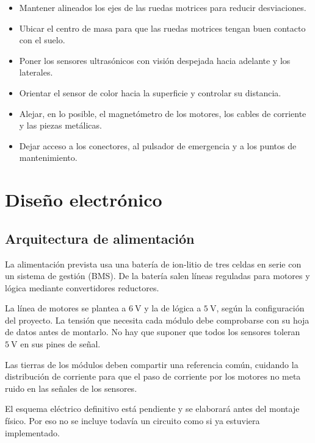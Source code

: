 \documentclass[journal]{IEEEtran}
\begin{document}
\begin{itemize}
    \item Mantener alineados los ejes de las ruedas motrices para reducir desviaciones.
    \item Ubicar el centro de masa para que las ruedas motrices tengan buen contacto con el suelo.
    \item Poner los sensores ultrasónicos con visión despejada hacia adelante y los laterales.
    \item Orientar el sensor de color hacia la superficie y controlar su distancia.
    \item Alejar, en lo posible, el magnetómetro de los motores, los cables de corriente y las piezas metálicas.
    \item Dejar acceso a los conectores, al pulsador de emergencia y a los puntos de mantenimiento.
\end{itemize}


\section{Diseño electrónico}

\subsection{Arquitectura de alimentación}

La alimentación prevista usa una batería de ion-litio de tres celdas en serie con un sistema de gestión (BMS). De la batería salen líneas reguladas para motores y lógica mediante convertidores reductores.

La línea de motores se plantea a $6~\mathrm{V}$ y la de lógica a $5~\mathrm{V}$, según la configuración del proyecto. La tensión que necesita cada módulo debe comprobarse con su hoja de datos antes de montarlo. No hay que suponer que todos los sensores toleran $5~\mathrm{V}$ en sus pines de señal.

Las tierras de los módulos deben compartir una referencia común, cuidando la distribución de corriente para que el paso de corriente por los motores no meta ruido en las señales de los sensores.

El esquema eléctrico definitivo está pendiente y se elaborará antes del montaje físico. Por eso no se incluye todavía un circuito como si ya estuviera implementado.
\end{document}
